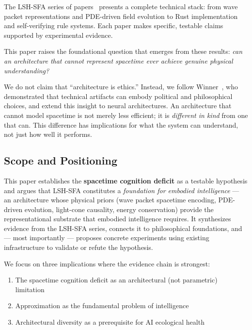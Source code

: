 \documentclass{article}
\begin{document}
The LSH-SFA series of papers~\citep{lsh-sfa, lsh-three-layer, lsh-attention, lsh-encoding-gradient, lsh-autoregressive, lsh-format, lsh-burn, lsh-rules, lsh-version-control} presents a complete technical stack: from wave packet representations and PDE-driven field evolution to Rust implementation and self-verifying rule systems. Each paper makes specific, testable claims supported by experimental evidence.

This paper raises the foundational question that emerges from these results: \textit{can an architecture that cannot represent spacetime ever achieve genuine physical understanding?}

We do not claim that ``architecture is ethics.'' Instead, we follow Winner~\citep{winner1980}, who demonstrated that technical artifacts can embody political and philosophical choices, and extend this insight to neural architectures. An architecture that cannot model spacetime is not merely less efficient; it is \textit{different in kind} from one that can. This difference has implications for what the system can understand, not just how well it performs.

\subsection{Scope and Positioning}

This paper establishes the \textbf{spacetime cognition deficit} as a testable hypothesis and argues that LSH-SFA constitutes a \textit{foundation for embodied intelligence} --- an architecture whose physical priors (wave packet spacetime encoding, PDE-driven evolution, light-cone causality, energy conservation) provide the representational substrate that embodied intelligence requires. It synthesizes evidence from the LSH-SFA series, connects it to philosophical foundations, and --- most importantly --- proposes concrete experiments using existing infrastructure to validate or refute the hypothesis.

We focus on three implications where the evidence chain is strongest:

\begin{enumerate}
\item The spacetime cognition deficit as an architectural (not parametric) limitation
\item Approximation as the fundamental problem of intelligence
\item Architectural diversity as a prerequisite for AI ecological health
\end{enumerate}
\end{document}
